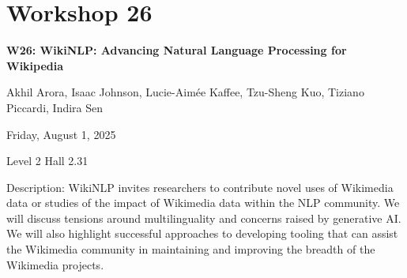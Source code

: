 \clearpage


\section[W26: WikiNLP: Advancing Natural Language Processing for Wikipedia]{Workshop 26}

\begin{center}
    {\Large \textbf{W26: WikiNLP: Advancing Natural Language Processing for Wikipedia}}

Akhil Arora, Isaac Johnson, Lucie-Aimée Kaffee, Tzu-Sheng Kuo, Tiziano Piccardi, Indira Sen

    Friday, August 1, 2025

Level 2 Hall 2.31
    
\end{center}

Description: WikiNLP invites researchers to contribute novel uses of Wikimedia data or studies of the impact of Wikimedia data within the NLP community. We will discuss tensions around multilinguality and concerns raised by generative AI. We will also highlight successful approaches to developing tooling that can assist the Wikimedia community in maintaining and improving the breadth of the Wikimedia projects.


